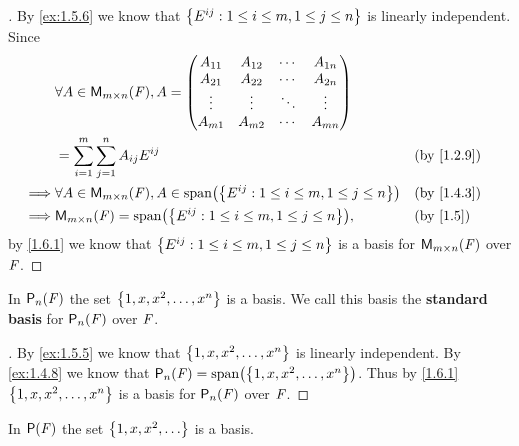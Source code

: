 \begin{proof}[]
  By \cref{ex:1.5.6} we know that \(\left\lbrace E^{i j} : 1 \leq i \leq m, 1 \leq j \leq n\right\rbrace\) is linearly independent.
  Since
  \begin{align*}
             & \forall A \in \ms, A = \begin{pmatrix}
                                        A_{1 1} & A_{1 2} & \cdots & A_{1 n} \\
                                        A_{2 1} & A_{2 2} & \cdots & A_{2 n} \\
                                        \vdots  & \vdots  & \ddots & \vdots  \\
                                        A_{m 1} & A_{m 2} & \cdots & A_{m n}
                                      \end{pmatrix}                                     \\
             & = \sum_{i = 1}^m \sum_{j = 1}^n A_{i j} E^{i j}                                 &  & \by{1.2.9} \\
    \implies & \forall A \in \ms, A \in \spn{\set{E^{i j} : 1 \leq i \leq m, 1 \leq j \leq n}} &  & \by{1.4.3} \\
    \implies & \ms = \spn{\set{E^{i j} : 1 \leq i \leq m, 1 \leq j \leq n}},                   &  & \by{1.5}
  \end{align*}
  by \cref{1.6.1} we know that \(\left\lbrace E^{i j} : 1 \leq i \leq m, 1 \leq j \leq n\right\rbrace\) is a basis for \(\ms\) over \(\mathit{F}\).
\end{proof}

\begin{eg}\label{1.6.5}
  In \(\ps[n]{\F}\) the set \(\left\lbrace1, x, x^2, \dots, x^n\right\rbrace\) is a basis.
  We call this basis the \textbf{standard basis} for \(\ps[n]{\F}\) over \(\mathit{F}\).
\end{eg}

\begin{proof}[]
  By \cref{ex:1.5.5} we know that \(\left\lbrace1, x, x^2, \dots, x^n\right\rbrace\) is linearly independent.
  By \cref{ex:1.4.8} we know that \(\ps[n]{\F} = \spn{\set{1, x, x^2, \dots, x^n}}\).
  Thus by \cref{1.6.1} \(\left\lbrace1, x, x^2, \dots, x^n\right\rbrace\) is a basis for \(\ps[n]{\F}\) over \(\mathit{F}\).
\end{proof}

\begin{eg}\label{1.6.6}
  In \(\ps{\F}\) the set \(\set{1, x, x^2, \dots}\) is a basis.
\end{eg}

